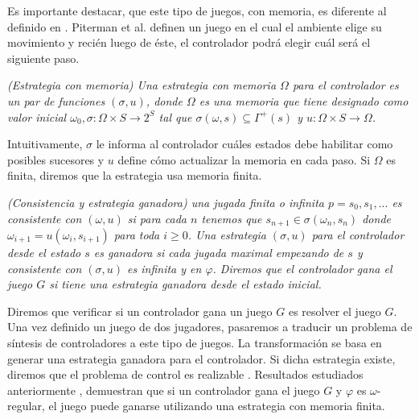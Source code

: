 Es importante destacar, que este tipo de juegos, con memoria, es diferente al definido en \cite{Piterman}. Piterman et al.
definen un juego en el cual el ambiente elige su movimiento y recién luego de éste, el controlador podrá elegir cuál será
el siguiente paso.

\begin{nahaDef}
    \emph{(Estrategia con memoria) Una estrategia con memoria $\Omega$ para el controlador es un par de funciones
    $(\sigma, u)$, donde $\Omega$ es una memoria que tiene designado como valor inicial $\omega_0, \sigma: \Omega \times
    S \rightarrow 2^S$ tal que $\sigma(\omega,s) \subseteq \Gamma^+(s)$ y $u: \Omega \times S \rightarrow \Omega$.}
\end{nahaDef}

Intuitivamente, $\sigma$ le informa al controlador cuáles estados debe habilitar como posibles sucesores y $u$ define
cómo actualizar la memoria en cada paso. Si $\Omega$ es finita, diremos que la estrategia usa memoria finita.

\begin{nahaDef}
    \emph{(Consistencia y estrategia ganadora) una jugada finita o infinita $p = s_0,s_1,...$ es consistente con
    $(\omega,u)$ si para cada $n$ tenemos que $s_{n+1} \in \sigma(\omega_n,s_n)$ donde $\omega_{i+1} = u(\omega_i,s_{i+1})$ 
    para toda $i \geq 0$. Una estrategia $(\sigma, u)$ para el controlador desde el estado $s$ es
    ganadora si cada jugada maximal empezando de $s$ y consistente con $(\sigma, u)$ es infinita y en $\varphi$. Diremos
    que el controlador gana el juego $G$ si tiene una estrategia ganadora desde el estado inicial.}
\end{nahaDef}

Diremos que verificar si un controlador gana un juego $G$ es resolver el juego $G$. Una vez definido un juego de dos
jugadores, pasaremos a traducir un problema de síntesis de controladores a este tipo de juegos. La transformación se
basa en generar una estrategia ganadora para el controlador. Si dicha estrategia existe, diremos que el problema de
control es realizable \cite{MalerPS95,21072}. Resultados estudiados anteriormente \cite{Pnueli:1989:SRM:75277.75293},
demuestran que si un controlador gana el juego $G$ y $\varphi$ es $\omega$-regular, el juego puede ganarse utilizando
una estrategia con memoria finita.

